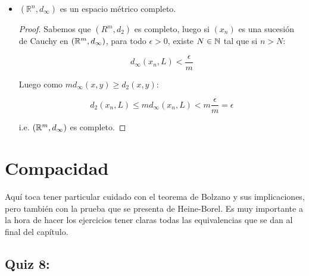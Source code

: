 \begin{itemize}[leftmargin=*]
    \begin{proof}
        Sabemos que $(\R^m,d_2)$ es completo, luego si $(a_n)$ es de Cauchy, entonces es convergente, tenemos que $(b_n)$ es convergente, por tanto $(a_n+b_n)$ es convergente, y toda sucesión convergente es de Cauchy.
    \end{proof}

    \item  $\left(\mathbb{R}^n, d_{\infty}\right)$ es un espacio métrico completo.\\

    \begin{proof}
        Sabemos que $(R^m,d_2)$ es completo, luego si $(x_n)$ es una sucesión de Cauchy en $(\mathbb{R}^m,d_{\infty})$, para todo $\epsilon>0$, existe $N\in \mathbb{N}$ tal que si $n>N$:

        $$d_{\infty}(x_n,L)<\frac{\epsilon}{m}$$

        Luego como $md_{\infty}(x,y)\geq d_2(x,y)$:

        $$d_{2}(x_n,L)\leq md_{\infty}(x_n,L)<m\frac{\epsilon}{m}=\epsilon$$

        i.e. $(\mathbb{R}^m,d_{\infty})$ es completo.
    \end{proof}
\end{itemize}


\section{Compacidad}

Aquí toca tener particular cuidado con el teorema de Bolzano y sus implicaciones, pero también con la prueba que se presenta de Heine-Borel. Es muy importante a la hora de hacer los ejercicios tener claras todas las equivalencias que se dan al final del capítulo.



\subsection{Quiz 8:}

